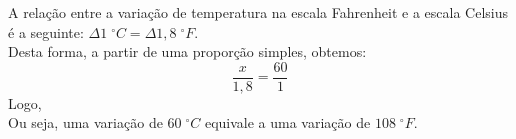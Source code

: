 %
%
	A relação entre a variação de temperatura na escala Fahrenheit e a escala Celsius é a seguinte: $\Delta 1\;^\circ C=\Delta 1,8\;^\circ F$.\\ Desta forma, a partir de uma proporção simples, obtemos: \[\dfrac{x}{1,8}=\dfrac{60}{1}\] Logo, \\ Ou seja, uma variação de $60\;^\circ C$ equivale a uma variação de $108\;^\circ F$.

